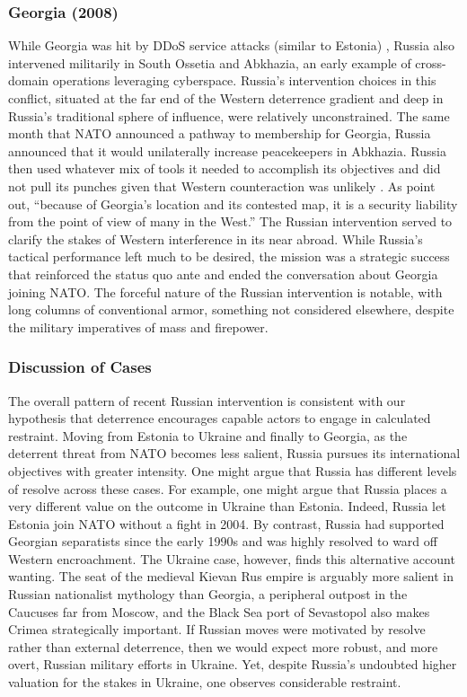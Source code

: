\documentclass[bibtex, autowc]{apsr_submission}
\begin{document}
\subsubsection{Georgia (2008)}
While Georgia was hit by DDoS service attacks (similar to Estonia) \citep{deibert_cyclonescyberspaceinformation_2012}, Russia also intervened militarily in South Ossetia and Abkhazia, an early example of cross-domain operations leveraging cyberspace. Russia’s intervention choices in this conflict, situated at the far end of the Western deterrence gradient and deep in Russia's traditional sphere of influence, were relatively unconstrained. The same month that NATO announced a pathway to membership for Georgia, Russia announced that it would unilaterally increase peacekeepers in Abkhazia. Russia then used whatever mix of tools it needed to accomplish its objectives and did not pull its punches given that Western counteraction was unlikely \citep{binnendijk_understandingrussianblack_2020}. As \citet[590]{driscoll_friendsthesebrinkmanship_2016} point out, ``because of Georgia’s location and its contested map, it is a security liability from the point of view of many in the West.'' The Russian intervention served to clarify the stakes of Western interference in its near abroad. While Russia’s tactical performance left much to be desired, the mission was a strategic success that reinforced the status quo ante and ended the conversation about Georgia joining NATO. The forceful nature of the Russian intervention is notable, with long columns of conventional armor, something not considered elsewhere, despite the military imperatives of mass and firepower.

\subsubsection{Discussion of Cases}
The overall pattern of recent Russian intervention is consistent with our hypothesis that deterrence encourages capable actors to engage in calculated restraint. Moving from Estonia to Ukraine and finally to Georgia, as the deterrent threat from NATO becomes less salient, Russia pursues its international objectives with greater intensity. One might argue that Russia has different levels of resolve across these cases. For example, one might argue that Russia places a very different value on the outcome in Ukraine than Estonia. Indeed, Russia let Estonia join NATO without a fight in 2004. By contrast, Russia had supported Georgian separatists since the early 1990s and was highly resolved to ward off Western encroachment. The Ukraine case, however, finds this alternative account wanting. The seat of the medieval Kievan Rus empire is arguably more salient in Russian nationalist mythology than Georgia, a peripheral outpost in the Caucuses far from Moscow, and the Black Sea port of Sevastopol also makes Crimea strategically important. If Russian moves were motivated by resolve rather than external deterrence, then we would expect more robust, and more overt, Russian military efforts in Ukraine. Yet, despite Russia’s undoubted higher valuation for the stakes in Ukraine, one observes considerable restraint.
\end{document}
